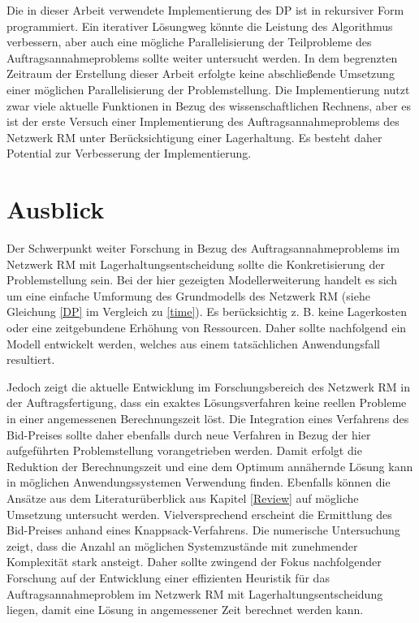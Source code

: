 Die in dieser Arbeit verwendete Implementierung des DP ist in rekursiver Form programmiert. Ein iterativer Lösungweg könnte die Leistung des Algorithmus verbessern, aber auch eine mögliche Parallelisierung der Teilprobleme des Auftragsannahmeproblems sollte weiter untersucht werden. In dem begrenzten Zeitraum der Erstellung dieser Arbeit erfolgte keine abschließende Umsetzung einer möglichen Parallelisierung der Problemstellung. Die Implementierung nutzt zwar viele aktuelle Funktionen in Bezug des wissenschaftlichen Rechnens, aber es ist der erste Versuch einer Implementierung des Auftragsannahmeproblems des Netzwerk RM unter Berücksichtigung einer Lagerhaltung. Es besteht daher Potential zur Verbesserung der Implementierung.

\section*{Ausblick}

Der Schwerpunkt weiter Forschung in Bezug des Auftragsannahmeproblems im Netzwerk RM mit Lagerhaltungsentscheidung sollte die Konkretisierung der Problemstellung sein. Bei der hier gezeigten Modellerweiterung handelt es sich um eine einfache Umformung des Grundmodells des Netzwerk RM (siehe Gleichung \eqref{DP} im Vergleich zu \eqref{time}). Es berücksichtig z. B. keine Lagerkosten oder eine zeitgebundene Erhöhung von Ressourcen. Daher sollte nachfolgend ein Modell entwickelt werden, welches aus einem tatsächlichen Anwendungsfall resultiert.

Jedoch zeigt die aktuelle Entwicklung im Forschungsbereich des Netzwerk RM in der Auftragsfertigung, dass ein exaktes Lösungsverfahren keine reellen Probleme in einer angemessenen Berechnungszeit löst. Die Integration eines Verfahrens des Bid-Preises sollte daher ebenfalls durch neue Verfahren in Bezug der hier aufgeführten Problemstellung vorangetrieben werden. Damit erfolgt die Reduktion der Berechnungszeit und eine dem Optimum annähernde Lösung kann in möglichen Anwendungssystemen Verwendung finden. Ebenfalls können die Ansätze aus dem Literaturüberblick aus Kapitel \ref{Review} auf mögliche Umsetzung untersucht werden. Vielversprechend erscheint die Ermittlung des Bid-Preises anhand eines Knappsack-Verfahrens. Die numerische Untersuchung zeigt, dass die Anzahl an möglichen Systemzustände mit zunehmender Komplexität stark ansteigt. Daher sollte zwingend der Fokus nachfolgender Forschung auf der Entwicklung einer effizienten Heuristik für das Auftragsannahmeproblem im Netzwerk RM mit Lagerhaltungsentscheidung liegen, damit eine Lösung in angemessener Zeit berechnet werden kann.



